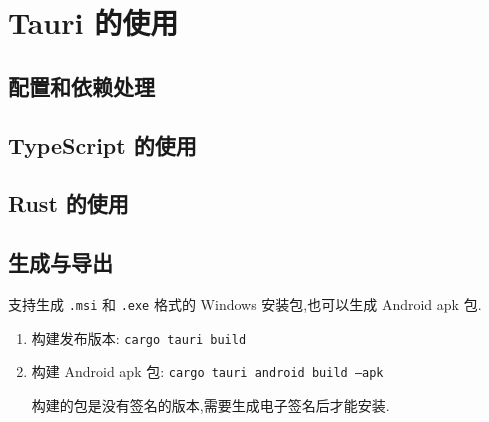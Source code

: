 
\usepackage{../../lectures_preamble}


    \section{Tauri 的使用}
    \subsection{配置和依赖处理}
    \subsection{TypeScript 的使用}
    \subsection{Rust 的使用}
    \subsection{生成与导出}
    支持生成 \texttt{.msi} 和 \texttt{.exe} 格式的 Windows 安装包,也可以生成 Android apk 包.

    \begin{enumerate}
        \item 构建发布版本: \texttt{cargo tauri build}
        \item 构建 Android apk 包: \texttt{cargo tauri android build --apk}

            构建的包是没有签名的版本,需要生成电子签名后才能安装.
    \end{enumerate}

